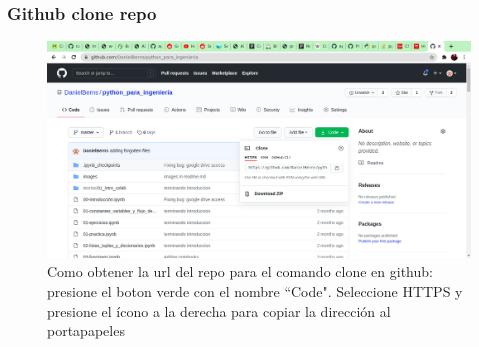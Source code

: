 \documentclass[11pt]{beamer}
\begin{document}
\begin{frame}
	\frametitle{Github clone repo}
	
\begin{figure}
	\centering
	\includegraphics[width=0.7\linewidth]{sc/github_clone_repo}
	\caption{Como obtener la url del repo para el comando clone en github: presione el boton verde con el nombre ``Code". Seleccione HTTPS y presione el ícono a la  derecha para copiar la dirección al portapapeles}
	\label{fig:githubclonerepo}
\end{figure}

	
\end{frame}
\end{document}

